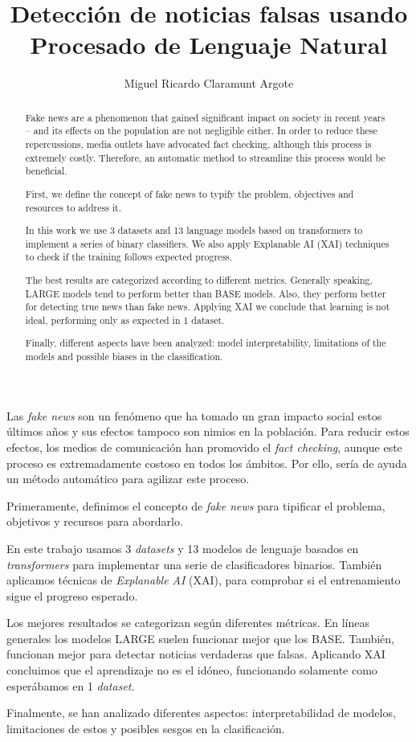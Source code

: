 \documentclass[twoside,spanish,a4paper,12pt]{tfg}
\title{Detección de noticias falsas usando Procesado de Lenguaje Natural}
\author{Miguel Ricardo Claramunt Argote}
\begin{document}
\portada
\cleardoublepage
\declaracion
\cleardoublepage


\begin{resumen}
	Las \textit{fake news} son un fenómeno que ha tomado un gran impacto social estos últimos años y sus efectos tampoco son nimios en la población. Para reducir estos efectos, los medios de comunicación han promovido el \textit{fact checking}, aunque este proceso es extremadamente costoso en todos los ámbitos. Por ello, sería de ayuda un método automático para agilizar este proceso.

	Primeramente, definimos el concepto de \textit{fake news} para tipificar el problema, objetivos y recursos para abordarlo.

	En este trabajo usamos 3 \textit{datasets} y 13 modelos de lenguaje basados en \textit{transformers} para implementar una serie de clasificadores binarios. También aplicamos técnicas de \textit{Explanable AI} (XAI), para comprobar si el entrenamiento sigue el progreso esperado.

	Los mejores resultados se categorizan según diferentes métricas. En líneas generales los modelos LARGE suelen funcionar mejor que los BASE. También, funcionan mejor para detectar noticias verdaderas que falsas. Aplicando XAI concluimos que el aprendizaje no es el idóneo, funcionando solamente como esperábamos en 1 \textit{dataset}.

	Finalmente, se han analizado diferentes aspectos: interpretabilidad de modelos, limitaciones de estos y posibles sesgos en la clasificación.
\end{resumen}
\cleardoublepage

\begin{abstract}
	Fake news are a phenomenon that gained significant impact on society in recent years -- and its effects on the population are not negligible either. In order to reduce these repercussions, media outlets have advocated fact checking, although this process is extremely costly. Therefore, an automatic method to streamline this process would be beneficial.

	First, we define the concept of fake news to typify the problem, objectives and resources to address it.

	In this work we use 3 datasets and 13 language models based on transformers to implement a series of binary classifiers. We also apply Explanable AI (XAI) techniques to check if the training follows expected progress.

	The best results are categorized according to different metrics. Generally speaking, LARGE models tend to perform better than BASE models. Also, they perform better for detecting true news than fake news. Applying XAI we conclude that learning is not ideal, performing only as expected in 1 dataset.

	Finally, different aspects have been analyzed: model interpretability, limitations of the models and possible biases in the classification.
\end{abstract}
\cleardoublepage
\end{document}
